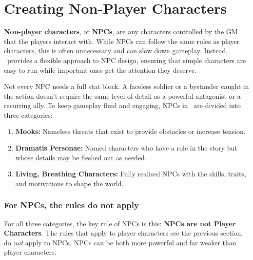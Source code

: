 \newcolumn

\section{Creating Non-Player Characters}\label{core:npcs}

\textbf{Non-player characters}, or \textbf{NPCs}, are any characters controlled by the GM that the players interact with. While NPCs can follow the same rules as player characters, this is often unnecessary and can slow down gameplay. Instead, \wyrd\ provides a flexible approach to NPC design, ensuring that simple characters are easy to run while important ones get the attention they deserve.

Not every NPC needs a full stat block. A faceless soldier or a bystander caught in the action doesn’t require the same level of detail as a powerful antagonist or a recurring ally. To keep gameplay fluid and engaging, NPCs in \wyrd\ are divided into three categories:

\begin{enumerate}
    \item \textbf{Mooks:} Nameless threats that exist to provide obstacles or increase tension.
    \item \textbf{Dramatis Personae:} Named characters who have a role in the story but whose details may be fleshed out as needed.
    \item \textbf{Living, Breathing Characters:} Fully realised NPCs with the skills, traits, and motivations to shape the world.
\end{enumerate}


\subsubsection{For NPCs, the rules do not apply}
For all three categories, the key rule of NPCs is this: \textbf{NPCs are not Player Characters}. The rules that apply to player characters see the previous section, do \emph{not} apply to NPCs. NPCs can be both more powerful and far weaker than player characters.

